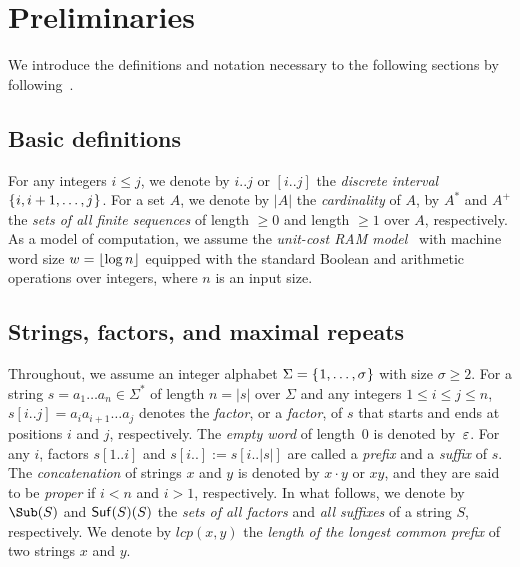 \documentclass{article}
\begin{document}
\section{Preliminaries}
\label{sec:prelim}

We introduce the definitions and notation necessary to the following sections by following~\cite{charalampopoulos2018extended,barton2014linear,ilie2011minimum,belazzougui2020linear}. 

\subsection{Basic definitions}
For any integers $i\le j$, we denote by $i..j$ or $[i..j]$ the \textit{discrete interval} $\{\kern0.05emi, i+1, \dots, j\kern0.05em\}$. For a set $A$, we denote by $|A|$ the \textit{cardinality} of $A$, by $A^*$ and $A^+$ the \textit{sets of all finite sequences} of length $\ge 0$ and length $\ge 1$ over $A$, respectively.
As a model of computation, we assume the \textit{unit-cost RAM model}~\cite{cormen2009introduction} with machine word size $w = \lfloor \log n\rfloor$ equipped with the standard Boolean and arithmetic operations over integers, where $n$ is an input size.

\subsection{Strings, factors, and maximal repeats}

Throughout, we assume an integer alphabet $\Sigma = \{\kern0.05em1, \dots, \sigma\kern0.05em\}$ with size $\sigma \ge 2$. 
For a string $s = a_1\dots a_n \in \Sigma^*$ of length $n = |s|$ over $\Sigma$ and any integers $1\le i\le j\le n$, $s[i..j] = a_i a_{i+1}\dots a_j$ denotes the \textit{factor}, or a \textit{factor}, of $s$ that starts and ends at positions $i$ and $j$, respectively. The \textit{empty word} of length~$0$ is denoted by~$\varepsilon$. For any $i$, factors $s[1..i]$ and $s[i..] := s[i..|s|]$ are called a \textit{prefix} and a \textit{suffix} of $s$. The \textit{concatenation} of strings $x$ and $y$ is denoted by $x\cdot y$ or $xy$, and they are said to be \textit{proper} if $i < n$ and $i > 1$, respectively. 
In what follows, we denote by $\Sub(S)$ and $\mathsf{Suf}{(S)}(S)$ the \textit{sets of all factors} and \textit{all suffixes} of a string $S$, respectively. We denote by $lcp(x, y)$ the \textit{length of the longest common prefix} of two strings $x$ and $y$. 
\end{document}

